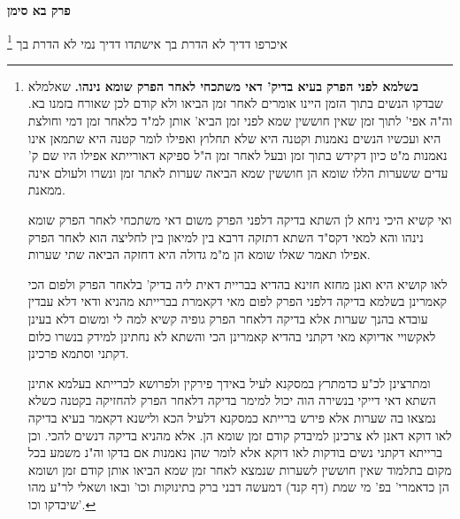 \documentclass[12pt, openany]{book}
\newcommand{\sethebfont}{
\fontsize{10.5pt}{21.0pt} \selectfont
}
\newcommand{\twocol}[1]{
	{\sethebfont \begin{multicols}{2}
			#1
	\end{multicols}}	
}
\newcommand{\chapname}{}
\newcommand{\newchap}[1]{
	\addcontentsline{toc}{chapter}{#1}
	\renewcommand{\chapname}{#1}
		\begin{center}
			\textbf{%
\fontsize{16pt}{16pt}\selectfont
				#1}
		\end{center}
}
\newcommand{\footnotecomment}[1]{
	\renewcommand\thefootnote{}
	\footnote{#1}}
\newcommand{\commenta}[1]{\footnotecomment{#1}}
\begin{document}
\newchap{פרק  בא סימן}
\twocol{
\commenta{\textbf{בשלמא לפני הפרק בעיא בדיק' דאי משתכחי לאחר הפרק שומא נינהו.} שאלמלא שבדקו הנשים בתוך הזמן היינו אומרים לאחר זמן הביאו ולא קודם לכן שאורח בזמנו בא. וה"ה אפי' לתוך זמן שאין חוששין שמא לפני זמן הביא' אותן למ"ד כלאחר זמן דמי וחולצת היא ועכשיו הנשים נאמנות וקטנה היא שלא תחלוץ ואפילו לומר קטנה היא שתמאן אינו נאמנות מ"ט כיון דקידש בתוך זמן ובעל לאחר זמן ה"ל ספיקא דאורייתא אפילו היו שם ק' עדים ששערות הללו שומא הן חוששין שמא הביאה שערות לאתר זמן ונשרו ולעולם אינה ממאנת.\par ואי קשיא היכי ניחא לן השתא בדיקה דלפני הפרק משום דאי משתכחי לאחר הפרק שומא נינהו והא למאי דקס"ד השתא דתזקה דרבא בין למיאון בין לחליצה הוא לאחר הפרק אפילו תאמר שאלו שומא הן מ"מ גדולה היא דחזקה הביאה שתי שערות.\par לאו קושיא היא ואנן מחזא חזינא בהדיא בבריית דאית ליה בדיק' בלאחר הפרק ולפום הכי קאמרינן בשלמא בדיקה דלפני הפרק לפום מאי דקאמרת בברייתא מהניא ודאי דלא עבדין עובדא בהנך שערות אלא בדיקה דלאחר הפרק גופיה קשיא למה לי ומשום דלא בעינן לאקשויי אדיוקא מאי דקתני בהדיא קאמרינן הכי והשתא לא נחתינן למידק בנשרו כלום דקתני וסתמא פרכינן.\par ומתרצינן לכ"ע כדמתרץ במסקנא לעיל באידך פירקין ולפרושא לברייתא בעלמא אתינן השתא דאי דייקי בנשירה הוה יכול למימר בדיקה דלאחר הפרק להחזיקה בקטנה כשלא נמצאו בה שערות אלא פירש ברייתא כמסקנא דלעיל הכא ולישנא דקאמר בעיא בדיקה לאו דוקא דאנן לא צרכינן למיבדק קודם זמן שומא הן. אלא מהניא בדיקה דנשים להכי. וכן ברייתא דקתני נשים בודקות לאו דוקא אלא לומר שהן נאמנות אם בדקו וה"נ משמע בכל מקום בתלמוד שאין חוששין לשערות שנמצא לאחר זמן שמא הביאו אותן קודם זמן ושומא הן כדאמרי' בפ' מי שמת (דף קנד) דמעשה דבני ברק בתינוקות וכו' ובאו ושאלי לר"ע מהו שיבדקו וכו'. }
איכרפו דדיך לא הדרת בך אישתדו דדיך נמי לא הדרת בך 
}
\end{document}
